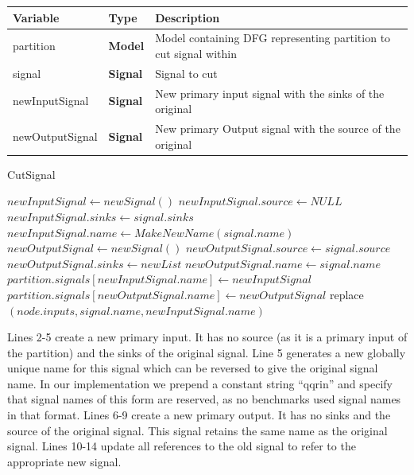 \documentclass[12pt,final,oneside,a4paper]{dwThesis} %
\begin{document}
   \begin{algorithm}

      \begin{center}

         \begin{tabularx}
            {\linewidth}{llX} \toprule
            Variable & Type & Description\\
            \midrule
            partition & \textbf{Model} & Model containing DFG representing partition to cut signal within \\
            signal & \textbf{Signal} & Signal to cut \\
            newInputSignal & \textbf{Signal} & New primary input signal with the sinks of the original\\
            newOutputSignal & \textbf{Signal} & New primary Output signal with the source of the original\\
            \bottomrule 
         \end{tabularx}


      \end{center}
      \caption{CutSignal}\label{algCutsignal}

      \begin{algorithmic}[1]
      		\State $newInputSignal \gets new Signal()$
      		\State $newInputSignal.source \gets NULL$
      		\State $newInputSignal.sinks \gets signal.sinks$
      		\State $newInputSignal.name \gets MakeNewName(signal.name)$ 
      		\State $newOutputSignal \gets new Signal()$
      		\State $newOutputSignal.source \gets signal.source$
      		\State $newOutputSignal.sinks \gets new List$ 
      		\State $newOutputSignal.name \gets signal.name$
      		\State $partition.signals[newInputSignal.name] \gets newInputSignal$
      		\State $partition.signals[newOutputSignal.name] \gets newOutputSignal$
      		\State
      			\State replace$(node.inputs, signal.name, newInputSignal.name)$ 
		\EndFor
\EndProcedure
      \end{algorithmic}
      \end{algorithm}
      Lines 2-5 create a new primary input. It has no source (as it is a primary input of the partition) and the sinks of the original signal.
      Line 5 generates a new globally unique name for this signal which can be reversed to give the original signal name. In our implementation we prepend a constant string ``qqrin'' and specify that signal names of this form are reserved, as no benchmarks used signal names in that format.
      Lines 6-9 create a new primary output. It has no sinks and the source of the original signal. This signal retains the same name as the original signal.
      Lines 10-14 update all references to the old signal to refer to the appropriate new signal.
\end{document}

